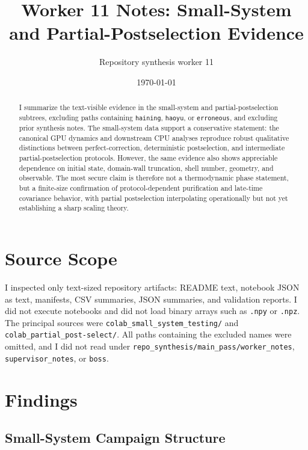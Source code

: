 \documentclass[aps,prb,onecolumn,nofootinbib,superscriptaddress]{revtex4-2}
\begin{document}
\title{Worker 11 Notes: Small-System and Partial-Postselection Evidence}
\author{Repository synthesis worker 11}
\date{\today}

\begin{abstract}
I summarize the text-visible evidence in the small-system and partial-postselection
subtrees, excluding paths containing \texttt{haining}, \texttt{haoyu}, or
\texttt{erroneous}, and excluding prior synthesis notes.  The small-system data
support a conservative statement: the canonical GPU dynamics and downstream CPU
analyses reproduce robust qualitative distinctions between perfect-correction,
deterministic postselection, and intermediate partial-postselection protocols.
However, the same evidence also shows appreciable dependence on initial state,
domain-wall truncation, shell number, geometry, and observable.  The most secure
claim is therefore not a thermodynamic phase statement, but a finite-size
confirmation of protocol-dependent purification and late-time covariance
behavior, with partial postselection interpolating operationally but not yet
establishing a sharp scaling theory.
\end{abstract}

\maketitle
\setcounter{tocdepth}{2}
\tableofcontents

\section{Source Scope}

I inspected only text-sized repository artifacts: README text, notebook JSON as
text, manifests, CSV summaries, JSON summaries, and validation reports.  I did
not execute notebooks and did not load binary arrays such as \texttt{.npy} or
\texttt{.npz}.  The principal sources were
\texttt{colab\_small\_system\_testing/} and
\texttt{colab\_partial\_post-select/}.  All paths containing the excluded names
were omitted, and I did not read under
\texttt{repo\_synthesis/main\_pass/worker\_notes},
\texttt{supervisor\_notes}, or \texttt{boss}.

\section{Findings}

\subsection{Small-System Campaign Structure}
\end{document}
